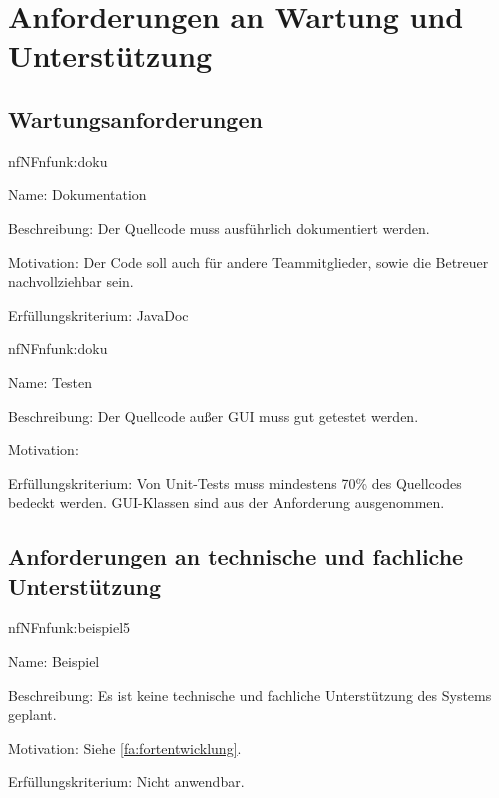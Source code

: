 \section{Anforderungen an Wartung und Unterstützung}

\subsection{Wartungsanforderungen}

\begin{description}[leftmargin=5em, style=sameline]	
	\begin{lhp}{nf}{NF}{nfunk:doku}
		\item [Name:] Dokumentation
		\item [Beschreibung:] Der Quellcode muss ausführlich dokumentiert werden.
		\item [Motivation:] Der Code soll auch für andere Teammitglieder, sowie die Betreuer nachvollziehbar sein.
		\item [Erfüllungskriterium:] JavaDoc 
	\end{lhp}
\end{description}

\begin{description}[leftmargin=5em, style=sameline]	
	\begin{lhp}{nf}{NF}{nfunk:doku}
		\item [Name:] Testen
		\item [Beschreibung:] Der Quellcode außer GUI muss gut getestet werden.
		\item [Motivation:] 
		\item [Erfüllungskriterium:] Von Unit-Tests muss mindestens 70\% des Quellcodes bedeckt werden. GUI-Klassen sind aus der Anforderung ausgenommen.
	\end{lhp}
\end{description}

\subsection{Anforderungen an technische und fachliche Unterstützung}

\begin{description}[leftmargin=5em, style=sameline]	
	\begin{lhp}{nf}{NF}{nfunk:beispiel5}
		\item [Name:] Beispiel
		\item [Beschreibung:] Es ist keine technische und fachliche Unterstützung des Systems geplant.
		\item [Motivation:] Siehe \ref{fa:fortentwicklung}.
		\item [Erfüllungskriterium:] Nicht anwendbar.
	\end{lhp}
\end{description}

